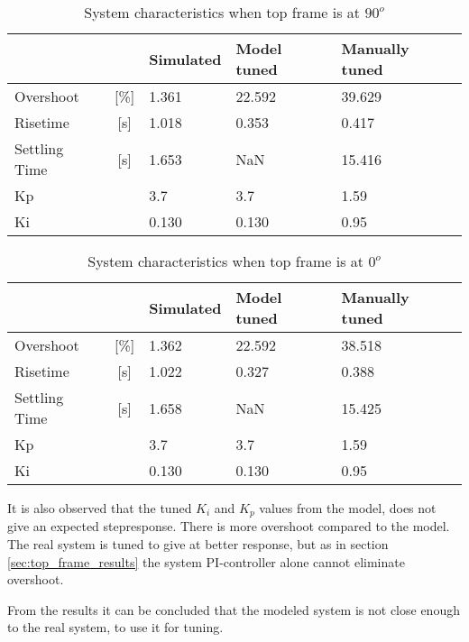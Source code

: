 \documentclass[../../Main]{subfiles}
\begin{document}
\begin{table}[H]
	\centering
	\begin{tabular}{lc|*{3}{l}}
		&&Simulated&Model tuned&Manually tuned\\
		\hline
		Overshoot&[\%]&1.361&22.592&39.629\\
		Risetime&[\si{s}]& 1.018&0.353&0.417\\
		Settling Time&[\si{s}]& 1.653&NaN& 15.416\\
		Kp&&3.7&3.7&1.59\\
		Ki&&0.130&0.130&0.95
	\end{tabular}
	\caption{System characteristics when top frame is at $90^o$}
	\label{tab:90_bot}
\end{table}

\begin{table}[H]
	\centering
	\begin{tabular}{lc|*{3}{l}}
		&&Simulated&Model tuned&Manually tuned\\
		\hline
		Overshoot&[\%]&1.362&22.592&38.518\\
		Risetime&[\si{s}]&1.022&0.327&0.388\\
		Settling Time&[\si{s}]&1.658&NaN&15.425\\
		Kp&&3.7&3.7&1.59\\
		Ki&&0.130&0.130&0.95
	\end{tabular}
	\caption{System characteristics when top frame is at $0^o$}
	\label{tab:0_bot}
\end{table}

It is also observed that the tuned $K_i$ and $K_p$ values from the model, does not give an expected stepresponse. There is more overshoot compared to the model. The real system is tuned to give at better response, but as in section \ref{sec:top_frame_results} the system PI-controller alone cannot eliminate overshoot.

From the results it can be concluded that the modeled system is not close enough to the real system, to use it for tuning.  
\end{document}
